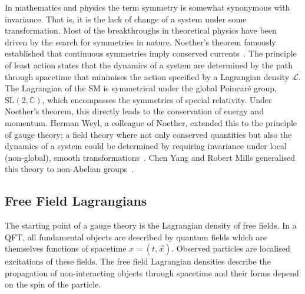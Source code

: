 In mathematics and physics the term symmetry is somewhat synonymous with invariance.
That is, it is the lack of change of a system under some transformation.
Most of the breakthroughs in theoretical physics have been driven by the search for symmetries in nature.
Noether's theorem famously established that continuous symmetries imply conserved currents~\cite{Noether1918}.
The principle of least action states that the dynamics of a system are determined by the path through spacetime that minimises the action specified by a Lagrangian density $\mathcal{L}$.
The Lagrangian of the SM is symmetrical under the global Poincaré group, $\text{SL}(2, \mathbb{C})$, which encompasses the symmetries of special relativity.
Under Noether's theorem, this directly leads to the conservation of energy and momentum.
Herman Weyl, a colleague of Noether, extended this to the principle of gauge theory; a field theory where not only conserved quantities but also the dynamics of a system could be determined by requiring invariance under local (non-global), smooth transformations~\cite{GaugeSym}.
Chen Yang and Robert Mills generalised this theory to non-Abelian groups~\cite{YangMills}.

\subsection{Free Field Lagrangians}

The starting point of a gauge theory is the Lagrangian density of free fields.
In a QFT, all fundamental objects are described by quantum fields which are themselves functions of spacetime $x = (t, \vec{x})$.
Observed particles are localised excitations of these fields.
The free field Lagrangian densities describe the propagation of non-interacting objects through spacetime and their forms depend on the spin of the particle.


